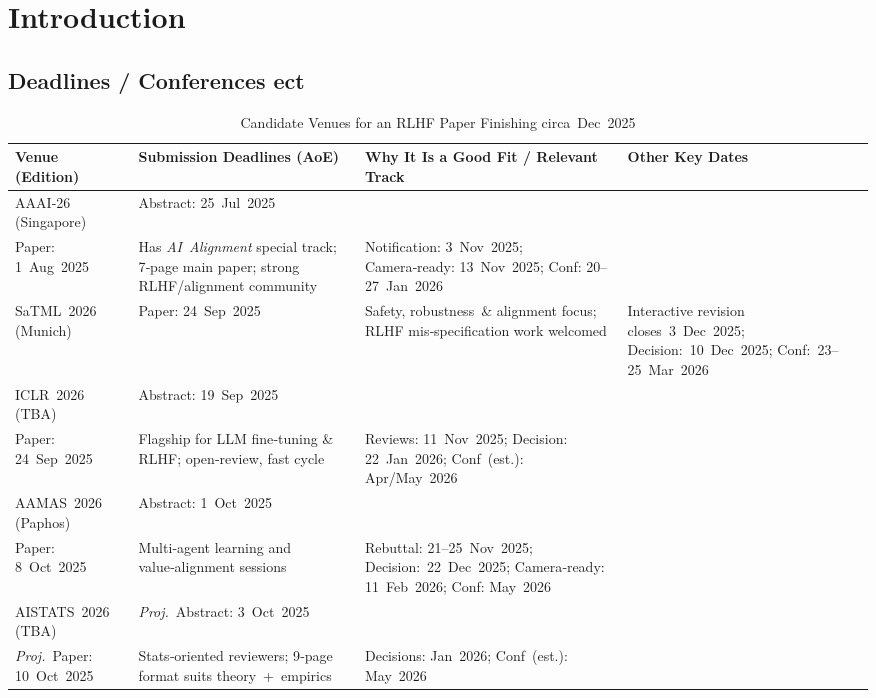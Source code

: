 \documentclass[sigconf]{acmart}
\begin{document}
\maketitle

\section{Introduction}

\subsection{Deadlines / Conferences ect}

\begin{table}[h]
\caption{Candidate Venues for an RLHF Paper Finishing circa Dec 2025}
\begin{adjustbox}{width=\linewidth}
\begin{tabular}{|p{3cm}|p{3.9cm}|p{5cm}|p{4.2cm}|}
\hline
\textbf{Venue (Edition)} & \textbf{Submission Deadlines (AoE)} & \textbf{Why It Is a Good Fit / Relevant Track} & \textbf{Other Key Dates} \\ \hline
AAAI‑26 (Singapore) & Abstract: 25 Jul 2025\\Paper: 1 Aug 2025 & Has \emph{AI Alignment} special track; 7‑page main paper; strong RLHF/alignment community & Notification: 3 Nov 2025; Camera‑ready: 13 Nov 2025; Conf: 20--27 Jan 2026 \\ \hline
SaTML 2026 (Munich) & Paper: 24 Sep 2025 & Safety, robustness \& alignment focus; RLHF mis‑specification work welcomed & Interactive revision closes 3 Dec 2025; Decision: 10 Dec 2025; Conf: 23--25 Mar 2026 \\ \hline
ICLR 2026 (TBA) & Abstract: 19 Sep 2025\\Paper: 24 Sep 2025 & Flagship for LLM fine‑tuning \& RLHF; open‑review, fast cycle & Reviews: 11 Nov 2025; Decision: 22 Jan 2026; Conf (est.): Apr/May 2026 \\ \hline
AAMAS 2026 (Paphos) & Abstract: 1 Oct 2025\\Paper: 8 Oct 2025 & Multi‑agent learning and value‑alignment sessions & Rebuttal: 21--25 Nov 2025; Decision: 22 Dec 2025; Camera‑ready: 11 Feb 2026; Conf: May 2026 \\ \hline
AISTATS 2026 (TBA) & \textit{Proj.}\ Abstract: 3 Oct 2025\\\textit{Proj.}\ Paper: 10 Oct 2025 & Stats‑oriented reviewers; 9‑page format suits theory + empirics & Decisions: Jan 2026; Conf (est.): May 2026 \\ \hline

\end{tabular}
\end{adjustbox}
\end{table}
\end{document}
